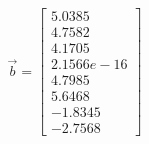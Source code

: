 \begin{equation} \Vec{b} = \begin{bmatrix}     5.0385\\     4.7582\\     4.1705\\ 2.1566e-16\\     4.7985\\     5.6468\\    -1.8345\\    -2.7568 \end{bmatrix} \label{eqsol} \end{equation}